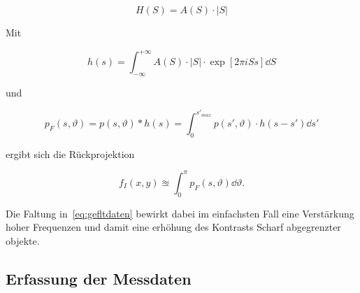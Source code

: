 \documentclass[slug=PET, room=Andreas-Schubert-Bau\,\ 424A, supervisor=Carsten\ Bittrich, coursedate=10.\ 01.\ 2020]{../../Lab_Report_LaTeX/lab_report}
\begin{document}
\begin{equation}\label{eq:filterfkt}
        H(S) = A(S) \cdot |S|
\end{equation}

Mit

\begin{equation}\label{eq:filterkern}
        h(s) = \int_{-\infty}^{+\infty} A(S) \cdot |S| \cdot \exp[2\pi i Ss] \dd{S}
\end{equation}

und

\begin{equation}\label{eq:gefltdaten}
        p_F(s, \vartheta) = p(s, \vartheta) * h(s) = \int_{0}^{s'_{max}} p(s', \vartheta) \cdot h(s-s') \dd{s}'
\end{equation}

ergibt sich die Rückprojektion

\begin{equation}\label{eq:rücktrafo}
        f_I(x,y) \approxeq \int_{0}^{\pi} p_F(s,\vartheta) \dd{\vartheta}.
\end{equation}

Die Faltung in~\eqref{eq:gefltdaten} bewirkt dabei im einfachsten Fall
eine Verst\"arkung hoher Frequenzen und damit eine erh\"ohung des
Kontrasts Scharf abgegrenzter objekte.

\subsection{Erfassung der Messdaten}
\label{sec:datenerf}
\end{document}
